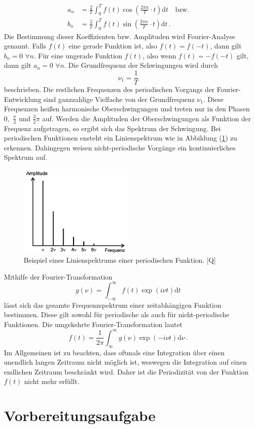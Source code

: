 \begin{align}
    a_n &= \frac{2}{T} \int_{0}^{T}f(t)\cos \left( \frac{2\pi n}{T}\cdot t\right)\text{d}t\quad \text{bzw.} \label{eqn:a_n}\\
    b_n &= \frac{2}{T} \int_{0}^{T}f(t)\sin \left( \frac{2\pi n}{T}\cdot t\right)\text{d}t\,.\label{eqn:b_n}
\end{align}
Die Bestimmung dieser Koeffizienten bzw. Amplituden wird Fourier-Analyse genannt. Falls $f(t)$ eine gerade Funktion ist, also $f(t)=f(-t)$, dann 
gilt $b_n = 0\,\,\forall n$. Für eine ungerade Funktion $f(t)$, also wenn $f(t) = -f(-t)$ gilt, dann gilt $a_n= 0\,\,\forall n$.
Die Grundfrequenz der Schwingungen wird durch
\begin{equation}
    \nu_1=\frac{1}{T}
    \label{eqn:Grundfrequenz}
\end{equation}
beschrieben. Die restlichen Frequenzen des periodischen Vorgangs der Fourier-Entwicklung sind ganzzahlige Vielfache von
der Grundfrequenz $\nu_1$. Diese Frequenzen heißen harmonische Oberschwingungen und treten nur in den Phasen $0,\,\, \frac{\pi}{2}$ und $\frac{3}{2}\pi$
auf. Werden die Amplituden der Oberschwingungen als Funktion der Frequenz aufgetragen, so ergibt sich das Spektrum der Schwingung. Bei periodischen
Funktionen ensteht ein Linienspektrum wie in Abbildung (\ref{fig:Linienspektrum}) zu erkennen. Dahingegen weisen nicht-periodische Vorgänge ein
kontinuierliches Spektrum auf.
\begin{figure}[H]
    \centering
    \includegraphics[width=0.50\textwidth]{Linienspektrum.png}
    \caption{Beispiel eines Linienspektrums einer periodischen Funktion. [Q\cite{anleitungV351}]}
    \label{fig:Linienspektrum}
\end{figure}
Mithilfe der Fourier-Transformation
\begin{equation}
    g(\nu)= \int_{-\infty}^{\infty}f(t)\exp\left(i \nu t\right) \text{d}t
    \label{eqn:FourierTransformation}
\end{equation}
lässt sich das gesamte Frequenzspektrum einer zeitabhängigen Funktion bestimmen. Diese gilt sowohl für periodische als auch für 
nicht-periodische Funktionen. Die umgekehrte Fourier-Transformation lautet
\begin{equation}
    f(t)=\frac{1}{2\pi}\int_{\infty}^{\infty}g(\nu)\exp\left(-i\nu t\right)\text{d}\nu\,.
    \label{eqn:reverseFourierTransformation}
\end{equation}
Im Allgemeinen ist zu beachten, dass oftmals eine Integration über einen unendlich langen Zeitraum nicht möglich ist, weswegen die Integration auf einen endlichen
Zeitraum beschränkt wird. Daher ist die Periodizität von der Funktion $f(t)$ nicht mehr erfüllt.
\section{Vorbereitungsaufgabe}
\label{sec:Vorbereitungsaufgabe}
